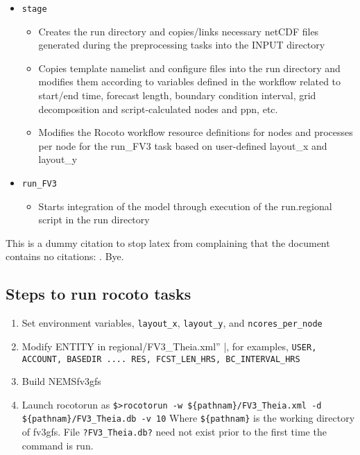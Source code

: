 \begin{itemize}
\begin{itemize}
    \end{itemize}
\item \verb|stage|
    \begin{itemize}
    \item Creates the run directory and copies/links necessary netCDF files generated during the preprocessing tasks into the INPUT directory
    \item Copies template namelist and configure files into the run directory and modifies them according to variables defined in the workflow related to start/end time, forecast length, boundary condition interval, grid decomposition and script-calculated nodes and ppn, etc.
    \item Modifies the Rocoto workflow resource definitions for nodes and processes per node for the run\_FV3 task based on user-defined layout\_x and layout\_y 
\end{itemize}
\item \verb|run_FV3|
    \begin{itemize}
    \item Starts integration of the model through execution of the run.regional script in the run directory
    \end{itemize}
\end{itemize}

This is a dummy citation to stop latex from complaining that the document contains no citations: \cite{Anderson2007}.  
Bye.


\subsection{Steps to run rocoto tasks}

\begin{enumerate}
\item Set environment variables, \verb|layout_x|, \verb|layout_y|, and \verb|ncores_per_node|
\item Modify ENTITY in \verb ''regional/FV3_Theia.xml'' |, for examples, 
\verb|USER, ACCOUNT, BASEDIR .... RES, FCST_LEN_HRS, BC_INTERVAL_HRS|
\item Build NEMSfv3gfs
\item Launch rocotorun as
\verb|$>rocotorun -w ${pathnam}/FV3_Theia.xml -d ${pathnam}/FV3_Theia.db -v 10|
Where \verb|${pathnam}| is the working directory of fv3gfs. File \verb|?FV3_Theia.db?| need not exist prior to the first time the command is run.
\end{enumerate}



